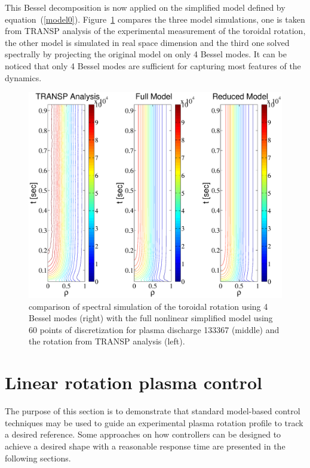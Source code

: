 \documentclass[12pt]{iopart}
\begin{document}
This Bessel decomposition is now applied on the simplified model defined by equation~(\ref{model0}). Figure~\ref{bessel1} compares the three model simulations, one is taken from TRANSP analysis of the experimental measurement of the toroidal rotation, the other model is simulated in real space dimension and the third one solved spectrally by projecting the original model on only 4 Bessel modes. It can be noticed that only 4 Bessel modes are sufficient for capturing most features of the dynamics.
\begin{figure}
\includegraphics[width=\linewidth]{imene_figs/bessel11n} %
\caption{comparison of spectral simulation of the toroidal rotation using 4 Bessel modes (right) with the full nonlinear simplified model using 60 points of discretization for plasma discharge 133367 (middle) and the rotation from TRANSP analysis (left). }
\label{bessel1}
\end{figure}

\section{Linear rotation plasma control}
 \label{LRPC}
 
 The purpose of this section is to demonstrate that standard model-based control techniques may be used to guide an experimental plasma rotation profile to track a desired reference. Some approaches on how controllers can be designed to achieve a desired shape with a reasonable response time are presented in the following sections.
 
\end{document}
